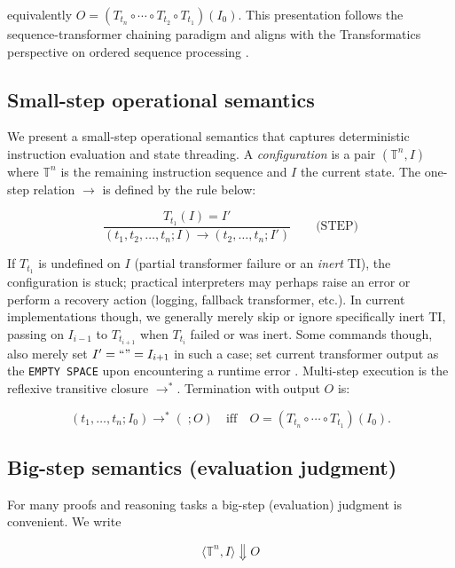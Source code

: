 \documentclass[acmtoplas]{acmart}
\begin{document}
equivalently \(O = (T_{t_n}\circ \cdots \circ T_{t_2}\circ T_{t_1})(I_0)\).  This presentation follows the sequence-transformer chaining paradigm and aligns with the Transformatics perspective on ordered sequence processing \cite{Lutalo2025_transformatics_thesis}.

\subsection{Small-step operational semantics}
We present a small-step operational semantics that captures deterministic instruction evaluation and state threading.  A \emph{configuration} is a pair \((\mathbb{T}^n, I)\) where \(\mathbb{T}^n\) is the remaining instruction sequence and \(I\) the current state.  The one-step relation \(\longrightarrow\) is defined by the rule below:


\vspace{1em}
\[
\frac{T_{t_1}(I) = I'}{(t_1, t_2, \dots, t_n; I) \longrightarrow (t_2, \dots, t_n; I')}
\qquad\text{(STEP)}
\]
\vspace{1em}


If \(T_{t_1}\) is undefined on \(I\) (partial transformer failure or an \textit{inert} TI), the configuration is stuck; practical interpreters may perhaps raise an error or perform a recovery action (logging, fallback transformer, etc.). In current implementations though, we generally merely skip or ignore specifically inert TI, passing on $I_{i-1}$ to $T_{t_{i+1}}$ when $T_{t_{i}}$ failed or was inert. Some commands though, also merely set $I' = ``" = I_{i+1}$ in such a case; set current transformer output as the \texttt{EMPTY SPACE} upon encountering a runtime error \cite{Lutalo2024TEATAZ}.  Multi-step execution is the reflexive transitive closure \(\longrightarrow^{*}\).  Termination with output \(O\) is:


\vspace{1em}
\[
(t_1,\dots,t_n; I_0) \longrightarrow^{*} (\; ; O) \quad\text{iff}\quad O = (T_{t_n}\circ\cdots\circ T_{t_1})(I_0).
\]
\vspace{1em}


\subsection{Big-step semantics (evaluation judgment)}
For many proofs and reasoning tasks a big-step (evaluation) judgment is convenient.  We write

\vspace{1em}
\[
\langle \mathbb{T}^n, I \rangle \Downarrow O
\]
\vspace{1em}
\end{document}
